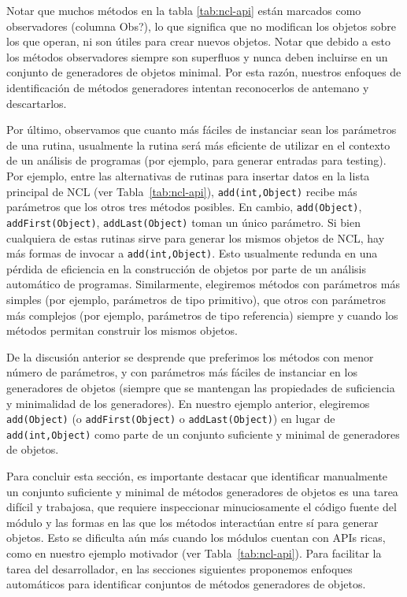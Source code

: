 Notar que muchos métodos en la tabla \ref{tab:ncl-api} están marcados como observadores (columna Obs?), lo que significa que no modifican los objetos sobre los que operan, ni son útiles para crear nuevos objetos. Notar que debido a esto los métodos observadores siempre son superfluos y nunca deben incluirse en un conjunto de generadores de objetos minimal. Por esta razón, nuestros enfoques de identificación de métodos generadores intentan reconocerlos de antemano y descartarlos.

Por último, observamos que cuanto más fáciles de instanciar sean los parámetros de una rutina, usualmente la rutina será más eficiente de utilizar en el contexto de un análisis de programas (por ejemplo, para generar entradas para testing). Por ejemplo, entre las alternativas de rutinas para insertar datos en
la lista principal de NCL (ver Tabla~\ref{tab:ncl-api}), \texttt{add(int,Object)} recibe más parámetros que los otros tres métodos posibles. En cambio, \texttt{add(Object)}, \texttt{addFirst(Object)}, \texttt{addLast(Object)} toman un único parámetro. Si bien cualquiera de estas rutinas sirve para generar los mismos objetos de NCL, hay más formas de invocar a \texttt{add(int,Object)}. Esto usualmente redunda en una pérdida de eficiencia en la construcción de objetos por parte de un análisis automático de programas. Similarmente, elegiremos métodos con parámetros más simples (por ejemplo, parámetros de tipo primitivo), que otros con parámetros más complejos (por ejemplo, parámetros de tipo referencia) siempre y cuando los métodos permitan construir los mismos objetos.

De la discusión anterior se desprende que preferimos los métodos con menor número de parámetros, y con parámetros más fáciles de instanciar en los generadores de objetos (siempre que se mantengan las propiedades de suficiencia y minimalidad de los generadores). 
En nuestro ejemplo anterior, elegiremos \texttt{add(Object)} (o \texttt{addFirst(Object)} o \texttt{addLast(Object)}) en lugar de \\
\texttt{add(int,Object)} 
como parte de un conjunto suficiente y minimal de generadores de objetos.

Para concluir esta sección, es importante destacar que identificar manualmente un conjunto suficiente y minimal de métodos generadores de objetos es una tarea difícil y trabajosa, que requiere inspeccionar minuciosamente el código fuente del módulo y las formas en las que los métodos interactúan entre sí para generar objetos. Esto se dificulta aún más cuando los módulos cuentan con APIs ricas, como en nuestro ejemplo motivador (ver Tabla~\ref{tab:ncl-api}). 
Para facilitar la tarea del desarrollador, en las secciones siguientes proponemos enfoques automáticos para identificar conjuntos de métodos generadores de objetos.

